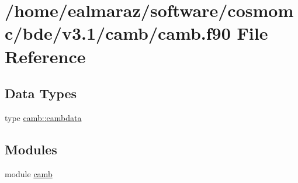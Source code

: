 \hypertarget{camb_8f90}{}\section{/home/ealmaraz/software/cosmomc/bde/v3.1/camb/camb.f90 File Reference}
\label{camb_8f90}
\subsection*{Data Types}
\begin{DoxyCompactItemize}
\item 
type \mbox{\hyperlink{structcamb_1_1cambdata}{camb\+::cambdata}}
\end{DoxyCompactItemize}
\subsection*{Modules}
\begin{DoxyCompactItemize}
\item 
module \mbox{\hyperlink{namespacecamb}{camb}}
\end{DoxyCompactItemize}
